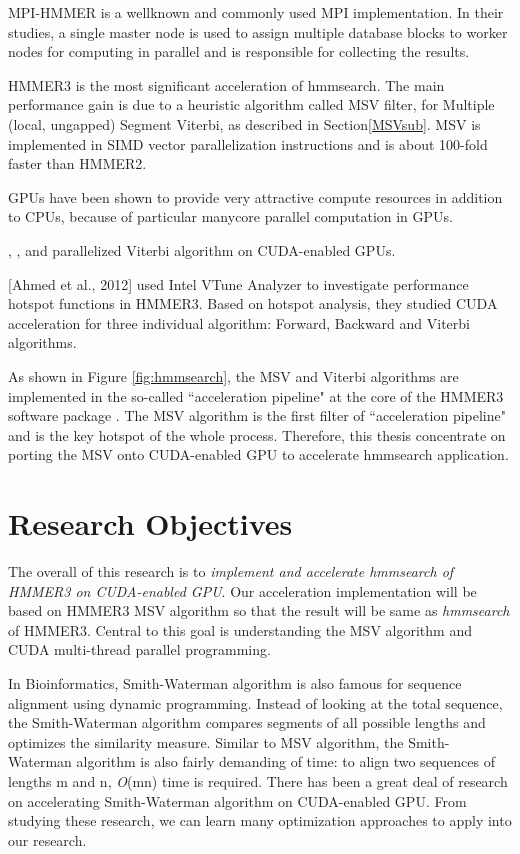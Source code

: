 MPI-HMMER \citep{Walters2006} is a wellknown and commonly used MPI implementation. In their studies, a single master node is used to assign multiple database blocks to worker nodes for computing in parallel and is responsible for collecting the results.

HMMER3 \citep{HMMER3} is the most significant acceleration of hmmsearch. The main performance gain is due to a heuristic algorithm called MSV filter, for Multiple (local, ungapped) Segment Viterbi, as described in Section\ref{MSVsub}. MSV is implemented in SIMD vector parallelization instructions and is about 100-fold faster than HMMER2.

GPUs have been shown to provide very attractive compute resources in addition to CPUs, because of particular manycore parallel computation in GPUs.

\citep{GPUHMM}, \citep{Ganesan}, \citep{Du} and \citep{Quirem} parallelized Viterbi algorithm on CUDA-enabled GPUs.

[Ahmed et al., 2012]\citep{Ahmed} used Intel VTune Analyzer \citep{Intel} to investigate performance hotspot functions in HMMER3. Based on hotspot analysis, they studied CUDA acceleration for three individual algorithm: Forward, Backward and Viterbi algorithms.

As shown in Figure \ref{fig:hmmsearch}, the MSV and Viterbi algorithms are implemented in the so-called ``acceleration pipeline" at the core of the HMMER3 software package \citep{HMMER3}. The MSV algorithm is the first filter of ``acceleration pipeline" and is the key hotspot of the whole process. Therefore, this thesis concentrate on porting the MSV onto CUDA-enabled GPU to accelerate hmmsearch application.

\section{Research Objectives}
The overall of this research is to \emph{implement and accelerate hmmsearch of HMMER3 on CUDA-enabled GPU}. Our acceleration implementation will be based on HMMER3 MSV algorithm so that the result will be same as \emph{hmmsearch} of HMMER3. Central to this goal is understanding the MSV algorithm and CUDA multi-thread parallel programming. 

In Bioinformatics, Smith-Waterman algorithm is also famous for sequence alignment using dynamic programming. Instead of looking at the total sequence, the Smith-Waterman algorithm compares segments of all possible lengths and optimizes the similarity measure. Similar to MSV algorithm, the Smith-Waterman algorithm is also fairly demanding of time: to align two sequences of lengths m and n, \emph{O}(mn) time is required. There has been a great deal of research on accelerating Smith-Waterman algorithm on CUDA-enabled GPU. From studying these research, we can learn many optimization approaches to apply into our research.

